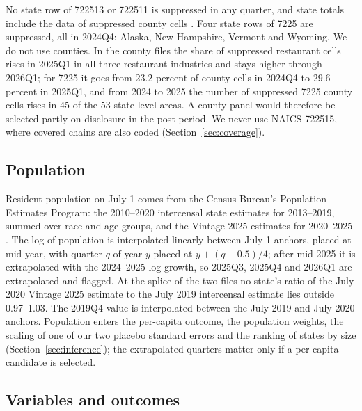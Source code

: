 No state row of 722513 or 722511 is suppressed in any quarter, and state totals include the data
of suppressed county cells \citep{blsqcewfaq}. Four state rows of 7225 are suppressed, all in
2024Q4: Alaska, New Hampshire, Vermont and Wyoming. We do not use counties. In the county files
the share of suppressed restaurant cells rises in 2025Q1 in all three restaurant industries and
stays higher through 2026Q1; for 7225 it goes from 23.2 percent of county cells in 2024Q4 to 29.6
percent in 2025Q1, and from 2024 to 2025 the number of suppressed 7225 county cells rises in 45
of the 53 state-level areas. A county panel would therefore be selected partly on disclosure in
the post-period. We never use NAICS 722515, where covered chains are also coded
(Section~\ref{sec:coverage}).

\subsection{Population}

Resident population on July 1 comes from the Census Bureau's Population Estimates Program: the
2010--2020 intercensal state estimates for 2013--2019, summed over race and age groups, and the
Vintage 2025 estimates for 2020--2025 \citep{censuspep2020int,censuspepv2025}. The log of
population is interpolated linearly between July 1 anchors, placed at mid-year, with quarter $q$
of year $y$ placed at $y + (q-0.5)/4$; after mid-2025 it is extrapolated with the 2024--2025 log
growth, so 2025Q3, 2025Q4 and 2026Q1 are extrapolated and flagged. At the splice of the two files
no state's ratio of the July 2020 Vintage 2025 estimate to the July 2019 intercensal estimate
lies outside 0.97--1.03. The 2019Q4 value is interpolated between the July 2019 and July 2020
anchors. Population enters the per-capita outcome, the population weights, the scaling of one of
our two placebo standard errors and the ranking of states by size (Section~\ref{sec:inference});
the extrapolated quarters matter only if a per-capita candidate is selected.

\subsection{Variables and outcomes}

